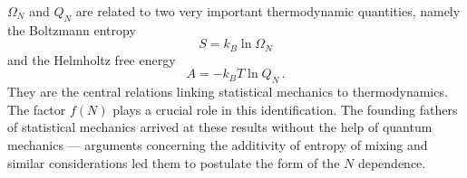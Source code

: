 \documentclass{article}
\theoremstyle{plain}\theoremheaderfont{\normalfont\itshape}\theorembodyfont{\rmfamily}\theoremseparator{.}\newtheorem*{rem}{Remark}\newtheorem*{ex}{Example}\newtheorem*{proof}{Proof}\newtheorem*{altp}{Alternative proof}
\theoremstyle{plain}\theoremheaderfont{\normalfont\bfseries}\theorembodyfont{\rmfamily}\theoremseparator{.}\newtheorem{thm}{Theorem}[section]\newtheorem{lem}[thm]{Lemma}\newtheorem{prop}[thm]{Proposition}\newtheorem*{cor}{Corollary}\newtheorem{defn}[thm]{Definition}\newtheorem{clm}[thm]{Claim}\newtheorem{clminproof}{Claim}\newtheorem{alg}[thm]{Algorithm}\newtheorem{hyp}[thm]{Hypothesis}\newtheorem{law}[thm]{Law}
\theoremstyle{break}\theoremheaderfont{\normalfont\itshape}\theorembodyfont{\rmfamily}\theoremseparator{.\medskip}\newtheorem*{proofskip}{Proof}\newtheorem*{exs}{Examples}\newtheorem*{rems}{Remarks}
\theoremstyle{break}\theoremheaderfont{\normalfont\bfseries}\theorembodyfont{\rmfamily}\theoremseparator{.\medskip}\newtheorem{lemskip}[thm]{Lemma}\newtheorem{defnskip}[thm]{Definition}\newtheorem{propskip}[thm]{Proposition}\newtheorem{thmskip}[thm]{Theorem}
\numberwithin{equation}{section}
\begin{document}
    \(\Omega_N\) and \(Q_N\) are related to two very important thermodynamic quantities, namely the Boltzmann entropy
    \begin{equation}
        S=k_B\ln\Omega_N
    \end{equation}
    and the Helmholtz free energy
    \begin{equation}\label{helmholtz_fundamental_eqn}
        A=-k_B T\ln Q_N\,.
    \end{equation}
    They are the central relations linking statistical mechanics to thermodynamics. The factor \(f(N)\) plays a crucial role in this identification. The founding fathers of statistical mechanics arrived at these results without the help of quantum mechanics --- arguments concerning the additivity of entropy of mixing and similar considerations led them to postulate the form of the \(N\) dependence.
\end{document}
